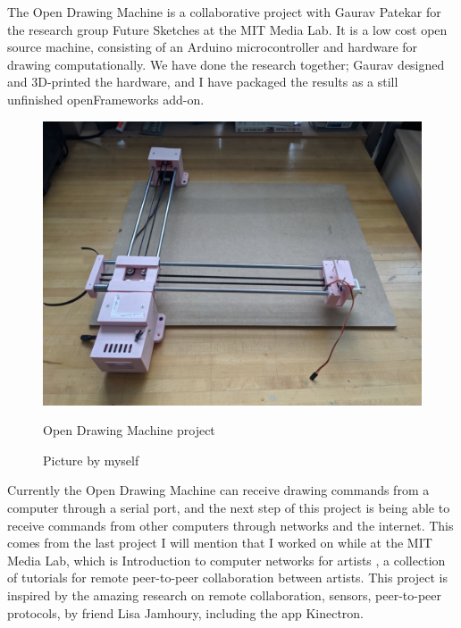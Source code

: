 The Open Drawing Machine \cite{website-open-drawing-machine} is a collaborative project with Gaurav Patekar for the research group Future Sketches at the MIT Media Lab. It is a low cost open source machine, consisting of an Arduino microcontroller and hardware for drawing computationally. We have done the research together; Gaurav designed and 3D-printed the hardware, and I have packaged the results as a still unfinished openFrameworks add-on.

\begin{figure}[ht]
  \centering
  \includegraphics[width=0.75\linewidth,height=0.25\textheight,keepaspectratio]{images/open-drawing-machine.jpg}
  \caption{Open Drawing Machine project}
  \caption*{Picture by myself}
  \label{fig:open-drawing-machine}
\end{figure}

Currently the Open Drawing Machine can receive drawing commands from a computer through a serial port, and the next step of this project is being able to receive commands from other computers through networks and the internet. This comes from the last project I will mention that I worked on while at the MIT Media Lab, which is Introduction to computer networks for artists \cite{website-intro-to-computer-networks-for-artists}, a collection of tutorials for remote peer-to-peer collaboration between artists. This project is inspired by the amazing research on remote collaboration, sensors, peer-to-peer protocols, by friend Lisa Jamhoury, including the app Kinectron.

